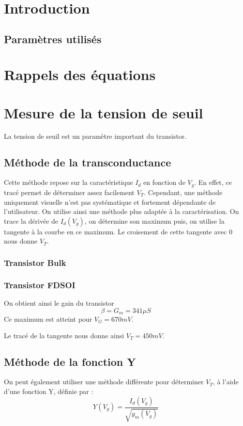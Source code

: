 \documentclass[a4paper,11pt]{report}
\begin{document}


\chapter*{Introduction}

\section*{Paramètres utilisés}

\chapter{Rappels des équations}

\chapter{Mesure de la tension de seuil}
La tension de seuil est un paramètre important du transistor. %
\section{Méthode de la transconductance}

Cette méthode repose sur la caractéristique $I_d$ en fonction de $V_g$. En effet, ce tracé permet de déterminer assez facilement $V_T$. Cependant, une méthode uniquement visuelle n'est pas systématique et fortement dépendante de l'utilisateur. On utilise ainsi une méthode plus adaptée à la caractérisation. On trace la dérivée de $I_d(V_g)$, on détermine son maximum puis, on utilise la tangente à la courbe en ce maximum. Le croisement de cette tangente avec 0 nous donne $V_T$.

\subsection{Transistor Bulk}
\subsection{Transistor FDSOI}
\noindent On obtient ainsi le gain du transistor \[\beta=G_m=341\mu S\] Ce maximum est atteint pour $V_G=670mV$.

Le tracé de la tangente nous donne ainsi $V_T=450mV$.

\section{Méthode de la fonction Y}
On peut également utiliser une méthode différente pour déterminer $V_T$, à l'aide d'une fonction Y, définie par :
\[Y(V_g)=\dfrac{I_d(V_g)}{\sqrt{g_m(V_g)}}\]
\end{document}
